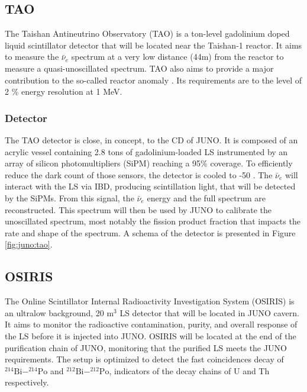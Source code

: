 \documentclass[../main.tex]{subfiles}
\begin{document}
\subsection{TAO}
\label{sec:juno:tao}
The Taishan Antineutrino Observatory (TAO) \cite{juno_collaboration_tao_2020, steiger_tao_2022} is a ton-level gadolinium doped liquid scintillator detector that will be located near the Taishan-1 reactor. It aims to measure the $\bar{\nu}_e$ spectrum at a very low distance (44m) from the reactor to measure a quasi-unoscillated spectrum. TAO also aims to provide a major contribution to the so-called reactor anomaly \cite{mention_reactor_2011}. Its requirements are to the level of 2 \% energy resolution at 1 MeV.

\subsubsection{Detector}

The TAO detector is close, in concept, to the CD of JUNO. It is composed of an acrylic vessel containing 2.8 tons of gadolinium-loaded LS instrumented by an array of silicon photomultipliers (SiPM) reaching a 95\% coverage. To efficiently reduce the dark count of those sensors, the detector is cooled to -50 \textcelsius.
The $\bar{\nu}_e$ will interact with the LS via IBD, producing scintillation light, that will be detected by the SiPMs. From this signal, the $\bar{\nu}_e$ energy and the full spectrum are reconstructed.
This spectrum will then be used by JUNO to calibrate the unoscillated spectrum, most notably the fission product fraction that impacts the rate and shape of the spectrum. A schema of the detector is presented in Figure \ref{fig:juno:tao}.

\subsection{OSIRIS}
\label{sec:juno:OSIRIS}
The Online Scintillator Internal Radioactivity Investigation System (OSIRIS) \cite{juno_collaboration_design_2021} is an ultralow background, 20 m$^3$ LS detector that will be located in JUNO cavern. It aims to monitor the radioactive contamination, purity, and overall response of the LS before it is injected into JUNO.
OSIRIS will be located at the end of the purification chain of JUNO, monitoring that the purified LS meets the JUNO requirements. The setup is optimized to detect the fast coincidences decay of $^{214}\mathrm{Bi}-^{214}\mathrm{Po}$ and $^{212}\mathrm{Bi}-^{212}\mathrm{Po}$, indicators of the decay chains of U and Th respectively.
\end{document}
